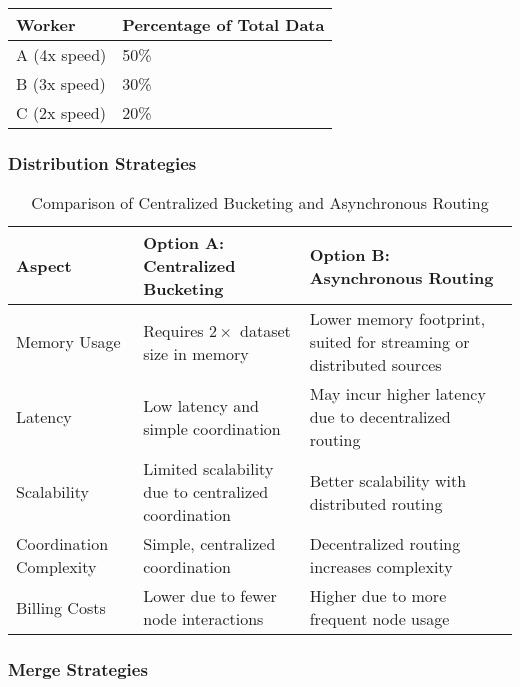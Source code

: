 \documentclass[]{interact}
\theoremstyle{plain}
\theoremstyle{definition}
\theoremstyle{remark}
\begin{document}
\begin{center}
\footnotesize
\renewcommand{\arraystretch}{1.5} %
\begin{tabular}{|p{6.7cm}|p{6.7cm}|}
\hline
\textbf{Worker} & \textbf{Percentage of Total Data} \\
\hline
A (4x speed) & 50\% \\
\hline
B (3x speed) & 30\% \\
\hline
C (2x speed) & 20\% \\
\hline
\end{tabular}
\end{center}


\subsubsection{Distribution Strategies}
\begin{table}[H]
\centering
\renewcommand{\arraystretch}{1.5} %
\footnotesize
\begin{tabular}{|p{3cm}|p{5cm}|p{5cm}|}
\hline
\textbf{Aspect} & \textbf{Option A: Centralized Bucketing} & \textbf{Option B: Asynchronous Routing} \\ \hline
Memory Usage & Requires $2 \times$ dataset size in memory & Lower memory footprint, suited for streaming or distributed sources \\ \hline
Latency & Low latency and simple coordination & May incur higher latency due to decentralized routing \\ \hline
Scalability & Limited scalability due to centralized coordination & Better scalability with distributed routing \\ \hline
Coordination Complexity & Simple, centralized coordination & Decentralized routing increases complexity \\ \hline
Billing Costs & Lower due to fewer node interactions & Higher due to more frequent node usage \\ \hline
\end{tabular}
\caption{Comparison of Centralized Bucketing and Asynchronous Routing}
\end{table}


\subsubsection{Merge Strategies}
\end{document}
